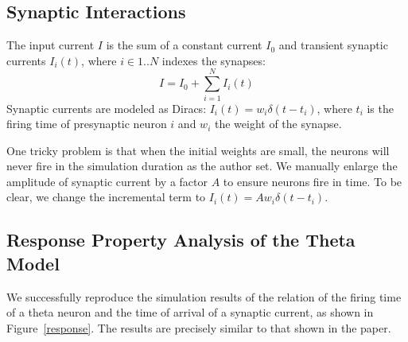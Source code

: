 \subsection{Synaptic Interactions}

The input current $I$ is the sum of a constant current $I_0$ and transient synaptic currents $I_i(t)$, 
where $i \in 1..N$ indexes the synapses:
\begin{equation}
	I = I_0 + \sum_{i=1}^N I_i(t)
\end{equation}
Synaptic currents are modeled as Diracs: $I_i(t) = w_i\delta(t - t_i)$,
where $t_i$ is the firing time of presynaptic neuron $i$ and $w_i$ the weight of the synapse.

One tricky problem is that when the initial weights are small, the neurons will never fire in the simulation duration as the author set. We manually enlarge the amplitude of synaptic current by a factor $A$ to ensure neurons fire in time. To be clear, we change the incremental term to $I_i(t) = Aw_i\delta(t - t_i)$.

\subsection{Response Property Analysis of the Theta Model}

We successfully reproduce the simulation results of the relation of the firing time of a theta neuron and the time of arrival of a synaptic current, as shown in Figure~\ref{response}. The results are precisely similar to that shown in the paper.


